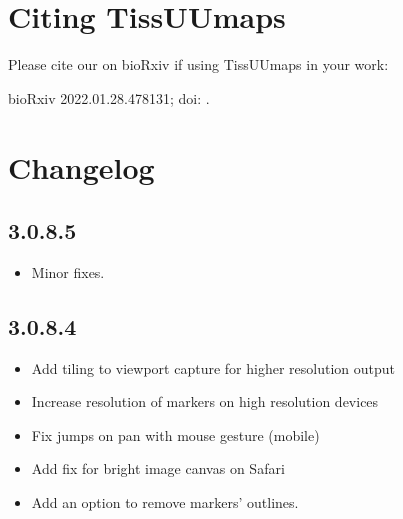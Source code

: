 \documentclass[letterpaper,10pt,english,openany,oneside]{sphinxmanual}
\begin{document}
\sphinxstepscope


\section{Citing TissUUmaps}
\label{\detokenize{docs/intro/citing:citing-tissuumaps}}\label{\detokenize{docs/intro/citing::doc}}
\sphinxAtStartPar
Please cite our  on bioRxiv if using TissUUmaps in your work:

\sphinxAtStartPar
{}  bioRxiv 2022.01.28.478131; doi: .

\sphinxstepscope


\section{Changelog}
\label{\detokenize{docs/intro/versions:changelog}}\label{\detokenize{docs/intro/versions::doc}}

\subsection{3.0.8.5}
\label{\detokenize{docs/intro/versions:id1}}\begin{itemize}
\item {} 
\sphinxAtStartPar
Minor fixes.

\end{itemize}


\subsection{3.0.8.4}
\label{\detokenize{docs/intro/versions:id2}}\begin{itemize}
\item {} 
\sphinxAtStartPar
Add tiling to viewport capture for higher resolution output

\item {} 
\sphinxAtStartPar
Increase resolution of markers on high resolution devices

\item {} 
\sphinxAtStartPar
Fix jumps on pan with mouse gesture (mobile)

\item {} 
\sphinxAtStartPar
Add fix for bright image canvas on Safari

\item {} 
\sphinxAtStartPar
Add an option to remove markers’ outlines.

\end{itemize}
\end{document}
